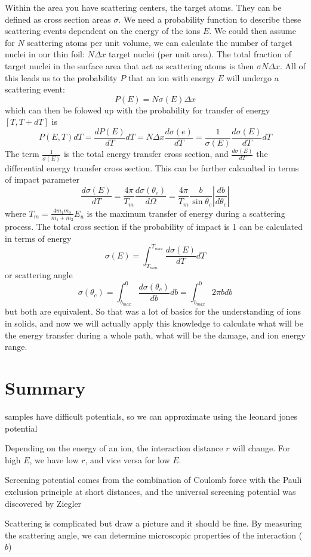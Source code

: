 Within the area you have scattering centers, the target atoms.
They can be defined as cross section areas $\sigma$.
We need a probability function to describe these scattering events dependent on the energy of the ions $E$.
We could then assume for $N$ scattering atoms per unit volume, we can calculate the number of target nuclei in our thin foil: $N \Delta x$ target nuclei (per unit area).
The total fraction of target nuclei in the surface area that act as scattering atoms is then $\sigma N \Delta x$.
All of this leads us to the probability $P$ that an ion with energy $E$ will undergo a scattering event:
$$P(E) = N\sigma(E) \Delta x$$
which can then be folowed up with the probability for transfer of energy $[T, T + dT]$ is
$$P(E, T)dT = \frac{dP(E)}{dT}dT = N \Delta x \frac{d\sigma (e)}{dT} = \frac{1}{\sigma (E)}\frac{d\sigma (E)}{dT}dT$$
The term $\frac{1}{\sigma (E)}$ is the total energy transfer cross section, and $\frac{d\sigma (E)}{dT}$ the differential energy transfer cross section.
This can be further calcualted in terms of impact parameter
$$\frac{d\sigma (E)}{dT} = \frac{4 \pi}{T_m} \frac{d\sigma (\theta_c)}{d\Omega} = \frac{4\pi}{T_m} \frac{b}{\sin\theta_c} \left| \frac{db}{d\theta_c} \right| $$
where $T_m = \frac{4m_1 m_2}{m_1 + m_2} E_u$ is the maximum transfer of energy during a scattering process.
The total cross section if the probability of impact is 1 can be calculated in terms of energy
$$\sigma (E) = \int_{T_{min}}^{T_{max}} \frac{d\sigma (E)}{dT}dT $$
or scattering angle
$$ \sigma (\theta_c) = \int_{b_{max}}^0 \frac{d\sigma (\theta_c)}{db}db =  \int_{b_{max}}^0  2\pi b db $$
but both are equivalent.
So that was a lot of basics for the understanding of ions in solids, and now we will actually apply this knowledge to calculate what will be the energy transfer during a whole path, what will be the damage, and ion energy range.

\section{Summary}\label{sec:summary3}

\begin{myitemize}
	\item samples have difficult potentials, so we can approximate using the leonard jones potential
	\item Depending on the energy of an ion, the interaction distance $r$ will change.
	For high $E$, we have low $r$, and vice versa for low $E$.
	\item Screening potential comes from the combination of Coulomb force with the Pauli exclusion principle at short distances, and the universal screening potential was discovered by Ziegler
	\item  Scattering is complicated but draw a picture and it should be fine.
    By measuring the scattering angle, we can determine microscopic properties of the interaction ($b$)
\end{myitemize}
